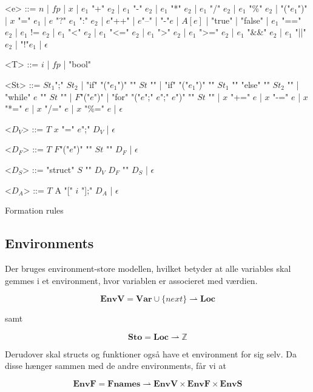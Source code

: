 \begin{Grammar}
 \begin{grammar}

 <e> ::= $n$ | $fp$ | $x$  | $e_1$ "+" $e_2$ | $e_1$ "-" $e_2$ | $e_1$ "*" $e_2$ | $e_1$ "/" $e_2$ | $e_1$ "\%" $e_2$ | "("$e_1$")" | $x$ "=" $e_1$ | $e$ "?" $e_1$ ":" $e_2$ | $e$"++" | $e$"--" | "-"$e$ | $A[e]$ | "true" | "false" | $e_1$ "==" $e_2$ | $e_1$ != $e_2$ | $e_1$ "<" $e_2$ | $e_1$ "<=" $e_2$ | $e_1$ ">" $e_2$ | $e_1$ ">=" $e_2$ | $e_1$ "\&\&" $e_2$ | $e_1$ "||" $e_2$ | "!"$e_1$ | $\epsilon$

 <T> ::= $i$ | $fp$ | "bool"
 
 <St> ::= $St_1$";" $St_2$ | "if" "("$e_1$")" "{" $St$ "}" | "if" "("$e_1$")" "{" $St_1$ "}" "else" "{" $St_2$ "}" | "while" $e$ "{" $St$ "}" | $F$"("$e$")" | "for" "("$e$";" $e$";" $e$")" "{" $St$ "}" | $x$ "+=" $e$ | $x$ "-=" $e$ | $x$ "*=" $e$ | $x$ "/=" $e$ | $x$ "\%=" $e$ | $\epsilon$
 
 <$D_V$> ::= $T$ $x$ "=" $e$";" $D_V$ | $\epsilon$
 
 <$D_F$> ::= $T$ $F$"("$e$")" "{" $St$ "}" $D_F$ | $\epsilon$
 
 <$D_S$> ::= "struct" $S$ "{" $D_V$ $D_F$ "}" $D_S$ | $\epsilon$
 
 <$D_A$> ::= $T$ A "[" $i$ "];" $D_A$ | $\epsilon$

 \end{grammar}
 \caption{Formation rules}\label{gra:formationrules}
\end{Grammar}

\subsection{Environments}

Der bruges environment-store modellen, hvilket betyder at alle variables skal gemmes i et environment, hvor variablen er associeret med værdien.

$$ \textbf{EnvV} = \textbf{Var} \cup \{next\} \rightharpoonup \textbf{Loc} $$

\noindent samt

$$ \textbf{Sto} = \textbf{Loc} \rightharpoonup \mathds{Z} $$

\noindent Derudover skal structs og funktioner også have et environment for sig selv. Da disse hænger sammen med de andre environments, får vi at

$$ \textbf{EnvF} = \textbf{Fnames} \rightharpoonup \textbf{EnvV} \times \textbf{EnvF} \times \textbf{EnvS} $$


